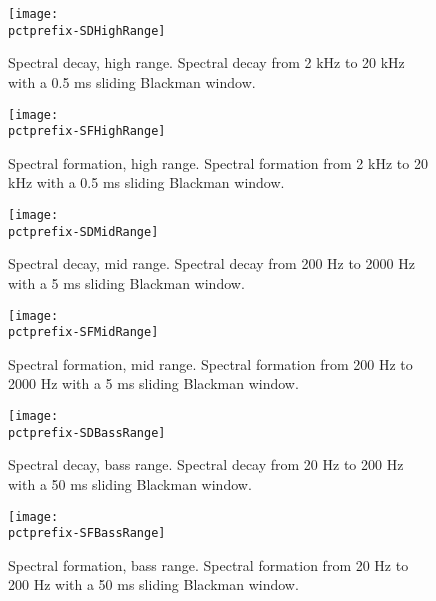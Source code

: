 \documentclass[a4paper,titlepage]{article}
\newcommand{\pctprefix}{T}
\newcommand{\pctwidth}{1.0}
\begin{document}
\begin{figure}
\begin{minipage}{\textwidth}
\begin{center}
\texttt{[image: \\pctprefix-SDHighRange]}
\caption{Spectral decay, high range. Spectral decay from 2 kHz to 20 kHz
with a 0.5 ms sliding Blackman window.}
\end{center}
\end{minipage}

\begin{minipage}{\textwidth}
\begin{center}
\texttt{[image: \\pctprefix-SFHighRange]}
\caption{Spectral formation,  high range. Spectral  formation from 2 kHz
to 20 kHz with a 0.5 ms sliding Blackman window.}
\end{center}
\end{minipage}
\end{figure}

\clearpage

\begin{figure}
\begin{minipage}{\textwidth}
\begin{center}
\texttt{[image: \\pctprefix-SDMidRange]}
\caption{Spectral decay,  mid range. Spectral  decay from 200 Hz to 2000
Hz with a 5 ms sliding Blackman window.}
\end{center}
\end{minipage}

\begin{minipage}{\textwidth}
\begin{center}
\texttt{[image: \\pctprefix-SFMidRange]}
\caption{Spectral formation,  mid range. Spectral  formation from 200 Hz
to 2000 Hz with a 5 ms sliding Blackman window.}
\end{center}
\end{minipage}
\end{figure}

\clearpage

\begin{figure}
\begin{minipage}{\textwidth}
\begin{center}
\texttt{[image: \\pctprefix-SDBassRange]}
\caption{Spectral decay, bass range. Spectral decay from 20 Hz to 200 Hz
with a 50 ms sliding Blackman window.}
\end{center}
\end{minipage}

\begin{minipage}{\textwidth}
\begin{center}
\texttt{[image: \\pctprefix-SFBassRange]}
\caption{Spectral formation,  bass range. Spectral  formation from 20 Hz
to 200 Hz with a 50 ms sliding Blackman window.}
\end{center}
\end{minipage}
\end{figure}
\end{document}
